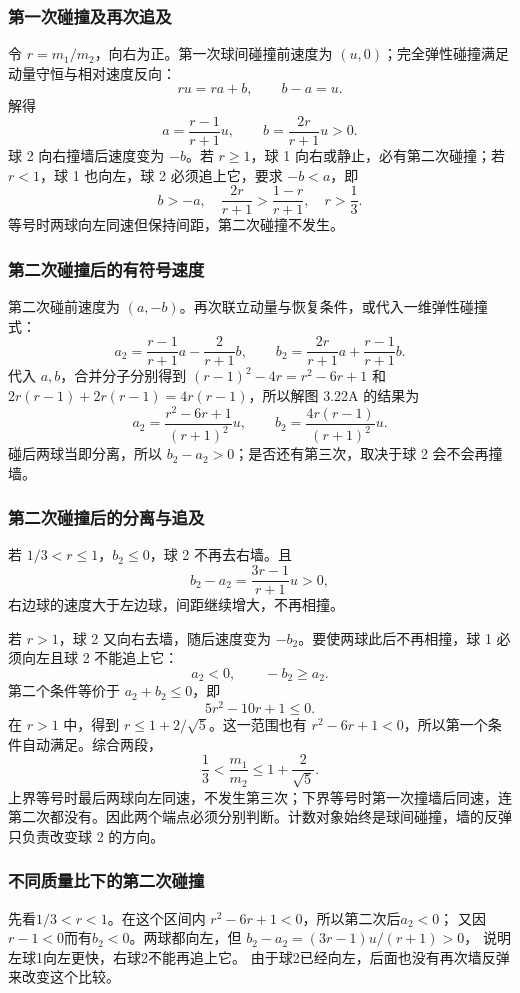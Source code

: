 \documentclass[UTF8,fontset=fandol,a4paper,11pt]{ctexart}
\begin{document}
\subsubsection*{第一次碰撞及再次追及}
令 $r=m_1/m_2$，向右为正。第一次球间碰撞前速度为 $(u,0)$；完全弹性碰撞满足动量守恒与相对速度反向：
\[
r u=r a+b,\qquad b-a=u.
\]
解得
\[
a=\frac{r-1}{r+1}u,\qquad b=\frac{2r}{r+1}u>0.
\]
球 2 向右撞墙后速度变为 $-b$。若 $r\geq1$，球 1 向右或静止，必有第二次碰撞；若 $r<1$，球 1 也向左，球 2 必须追上它，要求 $-b<a$，即
\[
b>-a,\quad \frac{2r}{r+1}>\frac{1-r}{r+1},\quad r>\frac13.
\]
等号时两球向左同速但保持间距，第二次碰撞不发生。

\subsubsection*{第二次碰撞后的有符号速度}
第二次碰前速度为 $(a,-b)$。再次联立动量与恢复条件，或代入一维弹性碰撞式：
\[
a_2=\frac{r-1}{r+1}a-\frac{2}{r+1}b,\qquad
b_2=\frac{2r}{r+1}a+\frac{r-1}{r+1}b.
\]
代入 $a,b$，合并分子分别得到 $(r-1)^2-4r=r^2-6r+1$ 和 $2r(r-1)+2r(r-1)=4r(r-1)$，所以解图 3.22A 的结果为
\[
a_2=\frac{r^2-6r+1}{(r+1)^2}u,\qquad
b_2=\frac{4r(r-1)}{(r+1)^2}u.
\]
碰后两球当即分离，所以 $b_2-a_2>0$；是否还有第三次，取决于球 2 会不会再撞墙。

\subsubsection*{第二次碰撞后的分离与追及}
若 $1/3<r\leq1$，$b_2\leq0$，球 2 不再去右墙。且
\[
b_2-a_2=\frac{3r-1}{r+1}u>0,
\]
右边球的速度大于左边球，间距继续增大，不再相撞。

若 $r>1$，球 2 又向右去墙，随后速度变为 $-b_2$。要使两球此后不再相撞，球 1 必须向左且球 2 不能追上它：
\[
a_2<0,\qquad -b_2\geq a_2.
\]
第二个条件等价于 $a_2+b_2\leq0$，即
\[
5r^2-10r+1\leq0.
\]
在 $r>1$ 中，得到 $r\leq1+2/\sqrt5$。这一范围也有
$r^2-6r+1<0$，所以第一个条件自动满足。综合两段，
\[
\boxed{\frac13<\frac{m_1}{m_2}\leq1+\frac2{\sqrt5}}.
\]
上界等号时最后两球向左同速，不发生第三次；下界等号时第一次撞墙后同速，连第二次都没有。因此两个端点必须分别判断。计数对象始终是球间碰撞，墙的反弹只负责改变球 2 的方向。
\subsubsection*{不同质量比下的第二次碰撞}
先看$1/3<r<1$。在这个区间内
$r^2-6r+1<0$，所以第二次后$a_2<0$；
又因$r-1<0$而有$b_2<0$。两球都向左，但
$b_2-a_2=(3r-1)u/(r+1)>0$，
说明左球1向左更快，右球2不能再追上它。
由于球2已经向左，后面也没有再次墙反弹来改变这个比较。
\end{document}
